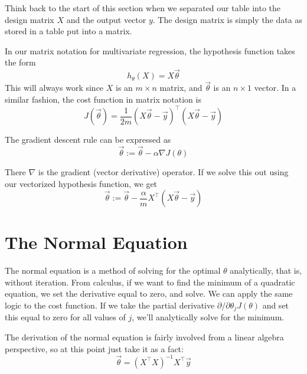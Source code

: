 Think back to the start of this section when we separated our table into the design matrix $X$ and the output vector $y$. The design matrix is simply the data as stored in a table put into a matrix. 

In our matrix notation for multivariate regression, the hypothesis function takes the form
\begin{equation}
h_\theta\left(X\right) = X\vec{\theta}
\end{equation}
This will always work since $X$ is an $m\times n$ matrix, and $\vec{\theta}$ is an $n \times 1$ vector. In a similar fashion, the cost function in matrix notation is
\begin{equation}
J\left(\vec{\theta}\right) = \frac{1}{2m} \left(X\vec{\theta} - \vec{y}\right)^\intercal \left(X\vec{\theta} - \vec{y}\right)
\end{equation}

The gradient descent rule can be expressed as
\begin{equation}
\vec{\theta} := \vec{\theta} - \alpha \nabla J\left(\theta\right) 
\end{equation}

There $\nabla$ is the gradient (vector derivative) operator. If we solve this out using our vectorized hypothesis function, we get
\begin{equation}
\vec{\theta} := \vec{\theta} - \frac{\alpha}{m}X^\intercal \left(X\vec{\theta} - \vec{y} \right) 
\end{equation}

\section{The Normal Equation}
The normal equation is a method of solving for the optimal $\theta$ analytically, that is, without iteration. From calculus, if we want to find the minimum of a quadratic equation, we set the derivative equal to zero, and solve. We can apply the same logic to the cost function. If we take the partial derivative $\partial/\partial \theta_j J\left(\theta\right)$ and set this equal to zero for all values of $j$, we'll analytically solve for the minimum. 

The derivation of the normal equation is fairly involved from a linear algebra perspective, so at this point just take it as a fact:
\begin{equation}
\vec{\theta} = \left( X^\intercal X \right) ^{-1} X^\intercal \vec{y}
\end{equation}


